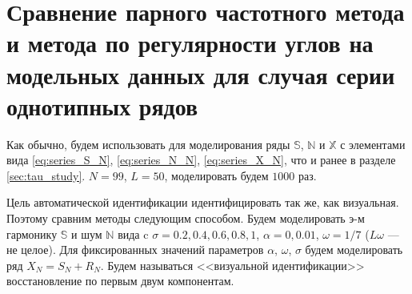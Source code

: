 \documentclass[specialist,
               substylefile = spbu.rtx,
               subf,href,colorlinks=true, 12pt]{disser}
\begin{document}
{{%
%
%
%
%

\section{Сравнение парного частотного метода и метода по регулярности углов на модельных данных для случая серии однотипных рядов}
\label{sec:comp_tau1_pgram_many_same_series}
Как обычно, будем использовать для моделирования ряды $\mathbb{S}$, $\mathbb{N}$ и $\mathbb{X}$ с элементами вида
\eqref{eq:series_S_N}, \eqref{eq:series_N_N}, \eqref{eq:series_X_N}, что и ранее в разделе \ref{sec:tau_study}. 
$N = 99$, $L = 50$, моделировать будем $1000$ раз. 

Цель автоматической идентификации идентифицировать так же, как визуальная. 
Поэтому сравним методы следующим способом. 
Будем моделировать э-м гармонику $\mathbb{S}$ и шум $\mathbb{N}$ вида 
c $\sigma = 0.2, 0.4, 0.6, 0.8, 1$, $\alpha = 0, 0.01$, $\omega = 1/7$ ($L\omega$ --- не целое).
Для фиксированных значений параметров $\alpha$, $\omega$, $\sigma$ будем моделировать ряд $X_N = S_N + R_N$. Будем называться <<визуальной идентификации>> восстановление по первым двум компонентам. 

}}
\end{document}
